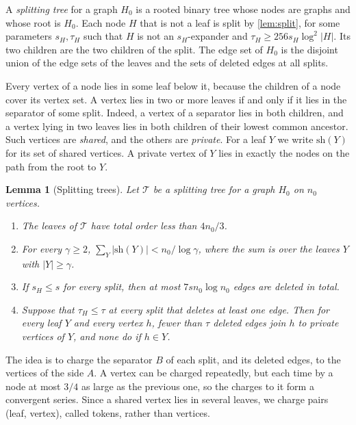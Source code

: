 \documentclass[11pt]{article}
\newtheorem{lemma}[theorem]{Lemma}
\theoremstyle{definition}
\theoremstyle{remark}
\numberwithin{equation}{section}
\numberwithin{figure}{section}
\numberwithin{table}{section}
\newcommand{\cT}{\mathcal{T}}
\newcommand{\sh}{\mathrm{sh}}
\begin{document}
A \emph{splitting tree} for a graph $H_0$ is a rooted binary tree whose nodes
are graphs and whose root is $H_0$. Each node $H$ that is not a leaf is split by
\cref{lem:split}, for some parameters $s_H,\tau_H$ such that $H$ is not an
$s_H$-expander and $\tau_H\ge256s_H\log^2|H|$. Its two children are the two
children of the split. The edge set of $H_0$ is the disjoint union of the edge
sets of the leaves and the sets of deleted edges at all splits.

Every vertex of a node lies in some leaf below it, because the children of a
node cover its vertex set. A vertex lies in two or more leaves if and only if it
lies in the separator of some split. Indeed, a vertex of a separator lies in
both children, and a vertex lying in two leaves lies in both children of their
lowest common ancestor. Such vertices are \emph{shared}, and the others are
\emph{private}. For a leaf $Y$ we write $\sh(Y)$ for its set of shared vertices.
A private vertex of $Y$ lies in exactly the nodes on the path from the root to
$Y$.

\begin{lemma}[Splitting trees]\label{lem:tree}
Let $\cT$ be a splitting tree for a graph $H_0$ on $n_0$ vertices.
\begin{enumerate}[label=\textup{(\alph*)},itemsep=1pt]
\item\label{it:tree-overlap} The leaves of $\cT$ have total order less than
$4n_0/3$.
\item\label{it:tree-shared} For every $\gamma\ge2$, $\sum_Y|\sh(Y)|<n_0/\log\gamma$,
where the sum is over the leaves $Y$ with $|Y|\ge\gamma$.
\item\label{it:tree-del} If $s_H\le s$ for every split, then at most
$7sn_0\log n_0$ edges are deleted in total.
\item\label{it:tree-thin} Suppose that $\tau_H\le\tau$ at every split that deletes
at least one edge. Then for every leaf $Y$ and every vertex $h$, fewer than
$\tau$ deleted edges join $h$ to private vertices of $Y$, and none do if
$h\in Y$.
\end{enumerate}
\end{lemma}

The idea is to charge the separator $B$ of each split, and its deleted edges,
to the vertices of the side $A$. A vertex can be charged repeatedly, but each
time by a node at most $3/4$ as large as the previous one, so the charges to it
form a convergent series. Since a shared vertex lies in several leaves, we
charge pairs (leaf, vertex), called tokens, rather than vertices.
\end{document}
